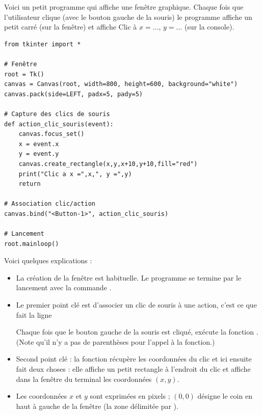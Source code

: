 \documentclass[11pt,class=report,crop=false]{standalone}
\begin{document}
\begin{cours}


Voici un petit programme qui affiche une fenêtre graphique. Chaque fois que l'utilisateur clique (avec le bouton gauche de la souris) le programme affiche un petit carré (sur la fenêtre) et affiche \og{}Clic à $x=\ldots$, $y=\ldots$\fg{} (sur la console).

\begin{lstlisting}
from tkinter import *

# Fenêtre
root = Tk()
canvas = Canvas(root, width=800, height=600, background="white")
canvas.pack(side=LEFT, padx=5, pady=5)

# Capture des clics de souris
def action_clic_souris(event):
    canvas.focus_set()
    x = event.x
    y = event.y
    canvas.create_rectangle(x,y,x+10,y+10,fill="red")
    print("Clic a x =",x,", y =",y)
    return

# Association clic/action
canvas.bind("<Button-1>", action_clic_souris)

# Lancement
root.mainloop()
\end{lstlisting}


Voici quelques explications :
\begin{itemize}
  \item La création de la fenêtre est habituelle. Le programme se termine par le lancement avec la commande .
  
  \item Le premier point clé est d'associer un clic de souris à une action, c'est ce que fait la ligne \\
\centerline{}
Chaque fois que le bouton gauche de la souris est cliqué, \Python{} exécute la fonction . (Note qu'il n'y a pas de parenthèses pour l'appel à la fonction.)

   \item Second point clé : la fonction  récupère les coordonnées du clic et ici ensuite fait deux choses : elle affiche un petit rectangle à l'endroit du clic et affiche dans la fenêtre du terminal les coordonnées $(x,y)$.
   
   \item Les coordonnées $x$ et $y$ sont exprimées en pixels ; $(0,0)$ désigne le coin en haut à gauche de la fenêtre (la zone délimitée par ).
\end{itemize}
\end{cours}
\end{document}
